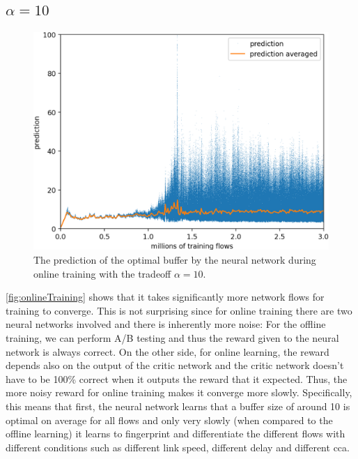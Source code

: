 \documentclass[conference]{IEEEtran}
\begin{document}
\subsection{$\alpha=10$}

\begin{figure}[h]
\includegraphics[width=\columnwidth]{figures/_mnt_cluster_results_RLQueueDisc_logs_plots_2020-6-1-16-41-30_prediction.png}
\caption{The prediction of the optimal buffer by the neural network during online training with the tradeoff $\alpha=10$.}
\label{fig:onlineTraining}
\end{figure}

\autoref{fig:onlineTraining} shows that it takes significantly more network flows for training to converge. This is not surprising since for online training there are two neural networks involved and there is inherently more noise: For the offline training, we can perform A/B testing and thus the reward given to the neural network is always correct. On the other side, for online learning, the reward depends also on the output of the critic network and the critic network doesn't have to be 100\% correct when it outputs the reward that it expected. Thus, the more noisy reward for online training makes it converge more slowly. Specifically, this means that first, the neural network learns that a buffer size of around 10 is optimal on average for all flows and only very slowly (when compared to the offline learning) it learns to fingerprint and differentiate the different flows with different conditions such as different link speed, different delay and different \gls{cca}. 
\end{document}
